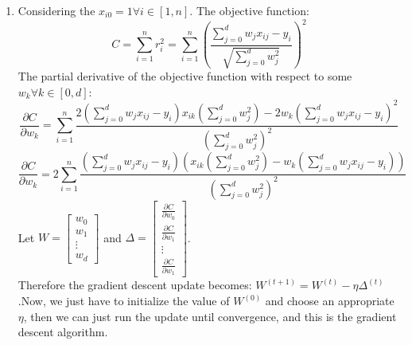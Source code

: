 \documentclass[twoside]{article}
\begin{document}
\begin{enumerate}
    \item
    Considering the $x_{i0} = 1 \forall i \in [1,n]$. The objective function:
    \begin{equation*}
        C = \sum_{i = 1}^n r_i^2 = \sum_{i = 1}^n \left( \frac{\sum_{j = 0}^d w_j x_{ij} - y_i}{\sqrt{\sum_{j=0}^d w_j^2}} \right)^2
    \end{equation*}
    The partial derivative of the objective function with respect to some $w_k \forall k \in [0,d]$:
    \begin{equation*}
        \frac{\partial C}{\partial w_k} =  \sum_{i = 1}^n \frac{2(\sum_{j=0}^d w_j x_{ij} -y_i)x_{ik}(\sum_{j=0}^d w_j^2) - 2w_k(\sum_{j=0}^d w_j x_{ij} -y_i)^2}{(\sum_{j=0}^d w_j^2)^2}
    \end{equation*}
    \begin{equation*}
    	\frac{\partial C}{\partial w_k} =  2\sum_{i = 1}^n \frac{(\sum_{j=0}^d w_j x_{ij} -y_i)\left(x_{ik}(\sum_{j=0}^d w_j^2) - w_k(\sum_{j=0}^d w_j x_{ij} -y_i)\right)}{(\sum_{j=0}^d w_j^2)^2}
    \end{equation*}
    Let $W = \begin{bmatrix} w_0\\w_1\\ \vdots\\ w_d \end{bmatrix}$ and $\Delta = \begin{bmatrix} \frac{\partial C}{\partial w_0}\\\frac{\partial C}{\partial w_1}\\ \vdots\\ \frac{\partial C}{\partial w_1} \end{bmatrix}$.\\
    Therefore the gradient descent update becomes: $W^{(t+1)} = W^{(t)} - \eta \Delta ^ {(t)}$.Now, we just have to initialize the value of $W^{(0)}$ and choose an appropriate $\eta$, then we can just run the update until convergence, and this is the gradient descent algorithm.
    
    
\end{enumerate}
\end{document}
